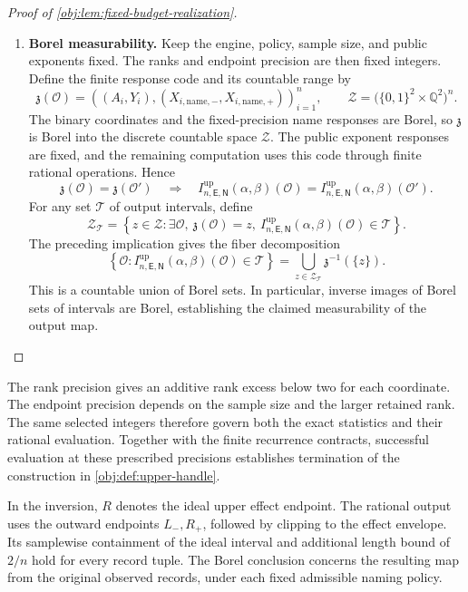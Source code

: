 \documentclass[11pt]{article}
\begin{document}
\begin{proof}[Proof of \cref{obj:lem:fixed-budget-realization}]
\begin{enumerate}
\item \textbf{Borel measurability.}
Keep the engine, policy, sample size, and public exponents fixed. The ranks and endpoint precision are then fixed integers. Define the finite response code and its countable range by
\[
\mathfrak z(\mathcal O)
=
\left(
(A_i,Y_i),
(X_{i,\mathrm{name},-},X_{i,\mathrm{name},+})
\right)_{i=1}^n,
\qquad
\mathcal Z
=
\bigl(\{0,1\}^2\times\mathbb Q^2\bigr)^n.
\]
The binary coordinates and the fixed-precision name responses are Borel, so \(\mathfrak z\) is Borel into the discrete countable space \(\mathcal Z\). The public exponent responses are fixed, and the remaining computation uses this code through finite rational operations. Hence
\[
\mathfrak z(\mathcal O)=\mathfrak z(\mathcal O')
\quad\Longrightarrow\quad
I^{\mathrm{up}}_{n,\mathsf E,\mathsf N}(\alpha,\beta)(\mathcal O)
=
I^{\mathrm{up}}_{n,\mathsf E,\mathsf N}(\alpha,\beta)(\mathcal O').
\]
For any set \(\mathcal T\) of output intervals, define
\[
\mathcal Z_{\mathcal T}
=
\left\{
z\in\mathcal Z:
\exists\mathcal O,\ 
\mathfrak z(\mathcal O)=z,\
I^{\mathrm{up}}_{n,\mathsf E,\mathsf N}(\alpha,\beta)(\mathcal O)
\in\mathcal T
\right\}.
\]
The preceding implication gives the fiber decomposition
\[
\left\{
\mathcal O:
I^{\mathrm{up}}_{n,\mathsf E,\mathsf N}(\alpha,\beta)(\mathcal O)
\in\mathcal T
\right\}
=
\bigcup_{z\in\mathcal Z_{\mathcal T}}
\mathfrak z^{-1}(\{z\}).
\]
This is a countable union of Borel sets. In particular, inverse images of Borel sets of intervals are Borel, establishing the claimed measurability of the output map.
\end{enumerate}
\end{proof}

The rank precision  gives an additive rank excess below two for each coordinate. The endpoint precision  depends on the sample size and the larger retained rank. The same selected integers therefore govern both the exact statistics and their rational evaluation. Together with the finite recurrence contracts, successful evaluation at these prescribed precisions establishes termination of the construction in \cref{obj:def:upper-handle}.

In the inversion, \(R\) denotes the ideal upper effect endpoint. The rational output uses the outward endpoints \(L_-,R_+\), followed by clipping to the effect envelope. Its samplewise containment of the ideal interval and additional length bound of \(2/n\) hold for every record tuple. The Borel conclusion concerns the resulting map from the original observed records, under each fixed admissible naming policy.
\end{document}
